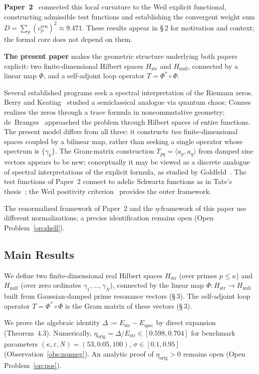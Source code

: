 \documentclass[11pt]{article}
\newcommand{\Hstr}{H_{\mathrm{str}}}
\newcommand{\Hnull}{H_{\mathrm{null}}}
\newcommand{\Estr}{E_{\mathrm{str}}}
\newcommand{\Espec}{E_{\mathrm{spec}}}
\newcommand{\etaorig}{\eta_{\mathrm{orig}}}
\begin{document}
\textbf{Paper~2}~\cite{Paper2} connected this local curvature to the
Weil explicit functional, constructing admissible test functions
and establishing the convergent weight sum
$D=\sum_p(c_p^{\mathrm{ren}})^2\approx 9.471$.
These results appear in \S\,2 for motivation and context;
the formal core does not depend on them.

\textbf{The present paper} makes the geometric structure underlying
both papers explicit: two finite-dimensional Hilbert spaces $\Hstr$
and $\Hnull$, connected by a linear map $\Phi$, and a self-adjoint
loop operator $T=\Phi^*\circ\Phi$.

Several established programs seek a spectral interpretation of the
Riemann zeros. Berry and Keating~\cite{BerryKeating} studied a
semiclassical analogue via quantum chaos;
Connes~\cite{Connes} realizes the zeros through a trace formula in
noncommutative geometry;
de~Branges~\cite{deBranges} approached the problem through Hilbert
spaces of entire functions. The present model differs from all three:
it constructs \emph{two} finite-dimensional spaces coupled by a
bilinear map, rather than seeking a single operator whose spectrum is
$\{\gamma_k\}$. The Gram-matrix construction
$T_{pq}=\langle a_p,a_q\rangle$ from damped sine vectors appears to
be new; conceptually it may be viewed as a discrete analogue of
spectral interpretations of the explicit formula, as studied by
Goldfeld~\cite{Goldfeld}. The test functions of Paper~2 connect to
adelic Schwartz functions as in Tate's thesis~\cite{Tate}; the Weil
positivity criterion~\cite{Weil,Lagarias} provides the outer
framework.

The renormalized framework of Paper~2 and the $\eta$-framework of
this paper use different normalizations; a precise identification
remains open (Open Problem~\ref{op:shell}).

\subsection{Main Results}

We define two finite-dimensional real Hilbert spaces $\Hstr$ (over
primes $p\le\kappa$) and $\Hnull$ (over zero ordinates
$\gamma_1,\ldots,\gamma_N$), connected by the linear map
$\Phi:\Hstr\to\Hnull$ built from Gaussian-damped prime resonance
vectors (\S\,3). The self-adjoint loop operator $T=\Phi^*\circ\Phi$
is the Gram matrix of these vectors (\S\,3).

We prove the algebraic identity $\Delta:=\Estr-\Espec$ by direct
expansion (Theorem~4.3). Numerically, $\etaorig=\Delta/\Estr\in
[0.598,0.704]$ for benchmark parameters
$(\kappa,\varepsilon,N)=(53,0.05,100)$, $\sigma\in[0.1,0.95]$
(Observation~\ref{obs:nonneg}). An analytic proof of $\etaorig>0$ remains open
(Open Problem~\ref{op:pos}).
\end{document}
